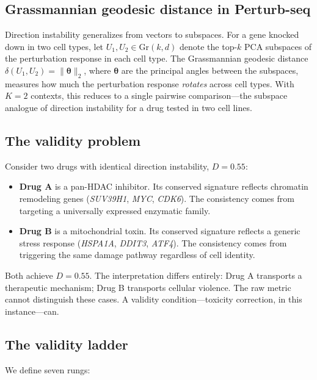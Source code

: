 \documentclass{article}
\begin{document}
\subsection{Grassmannian geodesic distance in Perturb-seq}

Direction instability generalizes from vectors to subspaces. For a gene
knocked down in two cell types, let $U_1, U_2 \in \text{Gr}(k, d)$ denote
the top-$k$ PCA subspaces of the perturbation response in each cell type.
The Grassmannian geodesic distance $\delta(U_1, U_2) =
\|\boldsymbol{\theta}\|_2$, where $\boldsymbol{\theta}$ are the principal
angles between the subspaces, measures how much the perturbation response
\emph{rotates} across cell types. With $K = 2$ contexts, this reduces to a
single pairwise comparison---the subspace analogue of direction instability
for a drug tested in two cell lines.

\subsection{The validity problem}

Consider two drugs with identical direction instability, $D = 0.55$:

\begin{itemize}
  \item \textbf{Drug A} is a pan-HDAC inhibitor. Its conserved signature
    reflects chromatin remodeling genes (\emph{SUV39H1}, \emph{MYC},
    \emph{CDK6}). The consistency comes from targeting a universally
    expressed enzymatic family.
  \item \textbf{Drug B} is a mitochondrial toxin. Its conserved signature
    reflects a generic stress response (\emph{HSPA1A}, \emph{DDIT3},
    \emph{ATF4}). The consistency comes from triggering the same damage
    pathway regardless of cell identity.
\end{itemize}

Both achieve $D = 0.55$. The interpretation differs entirely: Drug A
transports a therapeutic mechanism; Drug B transports cellular violence. The
raw metric cannot distinguish these cases. A validity condition---toxicity
correction, in this instance---can.

\subsection{The validity ladder}

We define seven rungs:
\end{document}
